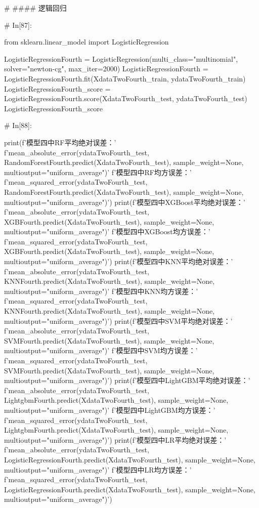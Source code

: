 \documentclass{MathorCupmodeling}
\begin{document}
\begin{python}
	# #### 逻辑回归
	
	# In[87]:
	
	
	from sklearn.linear_model import LogisticRegression
	
	LogisticRegressionFourth = LogisticRegression(multi_class="multinomial", solver="newton-cg", max_iter=2000)
	LogisticRegressionFourth = LogisticRegressionFourth.fit(XdataTwoFourth_train, ydataTwoFourth_train)
	LogisticRegressionFourth_score = LogisticRegressionFourth.score(XdataTwoFourth_test, ydataTwoFourth_test)
	LogisticRegressionFourth_score
	
	# In[88]:
	
	
	print(f'模型四中RF平均绝对误差：'
		  f'{mean_absolute_error(ydataTwoFourth_test, RandomForestFourth.predict(XdataTwoFourth_test), sample_weight=None, multioutput="uniform_average")}\n'
		  f'模型四中RF均方误差：'
		  f'{mean_squared_error(ydataTwoFourth_test, RandomForestFourth.predict(XdataTwoFourth_test), sample_weight=None, multioutput="uniform_average")}')
	print(f'模型四中XGBoost平均绝对误差：'
		  f'{mean_absolute_error(ydataTwoFourth_test, XGBFourth.predict(XdataTwoFourth_test), sample_weight=None, multioutput="uniform_average")}\n'
		  f'模型四中XGBoost均方误差：'
		  f'{mean_squared_error(ydataTwoFourth_test, XGBFourth.predict(XdataTwoFourth_test), sample_weight=None, multioutput="uniform_average")}')
	print(f'模型四中KNN平均绝对误差：'
		  f'{mean_absolute_error(ydataTwoFourth_test, KNNFourth.predict(XdataTwoFourth_test), sample_weight=None, multioutput="uniform_average")}\n'
		  f'模型四中KNN均方误差：'
		  f'{mean_squared_error(ydataTwoFourth_test, KNNFourth.predict(XdataTwoFourth_test), sample_weight=None, multioutput="uniform_average")}')
	print(f'模型四中SVM平均绝对误差：'
		  f'{mean_absolute_error(ydataTwoFourth_test, SVMFourth.predict(XdataTwoFourth_test), sample_weight=None, multioutput="uniform_average")}\n'
		  f'模型四中SVM均方误差：'
		  f'{mean_squared_error(ydataTwoFourth_test, SVMFourth.predict(XdataTwoFourth_test), sample_weight=None, multioutput="uniform_average")}')
	print(f'模型四中LightGBM平均绝对误差：'
		  f'{mean_absolute_error(ydataTwoFourth_test, LightgbmFourth.predict(XdataTwoFourth_test), sample_weight=None, multioutput="uniform_average")}\n'
		  f'模型四中LightGBM均方误差：'
		  f'{mean_squared_error(ydataTwoFourth_test, LightgbmFourth.predict(XdataTwoFourth_test), sample_weight=None, multioutput="uniform_average")}')
	print(f'模型四中LR平均绝对误差：'
		  f'{mean_absolute_error(ydataTwoFourth_test, LogisticRegressionFourth.predict(XdataTwoFourth_test), sample_weight=None, multioutput="uniform_average")}\n'
		  f'模型四中LR均方误差：'
		  f'{mean_squared_error(ydataTwoFourth_test, LogisticRegressionFourth.predict(XdataTwoFourth_test), sample_weight=None, multioutput="uniform_average")}')
	

\end{python}
\end{document}
